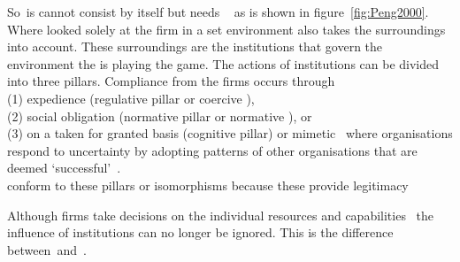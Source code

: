 So~\ibv is cannot consist by itself but needs \rbv~\cite{Barney:1991, Porter:1980} as is shown in figure~\ref{fig:Peng2000}. 
Where \rbv looked solely at the firm in a set environment \ibv also takes the surroundings into account. These surroundings are the institutions that govern the environment the \mne is playing the game. 
The actions of institutions can be divided into three pillars. Compliance from the firms occurs through \\(1) expedience (regulative pillar or coercive \iso),\\
 (2) social obligation (normative pillar or normative \iso), or \\
 (3) on a taken for granted basis (cognitive pillar) or mimetic \iso~where organisations respond to uncertainty by adopting patterns of other organisations that are deemed `successful'~\cite{Westney:2005,Peng:2008,Kostova:1999,DiMaggio:1983,Scott:1995}.\\ 
\mne conform to these pillars or isomorphisms because these provide legitimacy~\cite{Powell:1991}

Although firms take decisions on the individual resources and capabilities~\cite{Barney:1991} the influence of institutions can no longer be ignored. This is the difference between~\rbv and~\ibv. 

